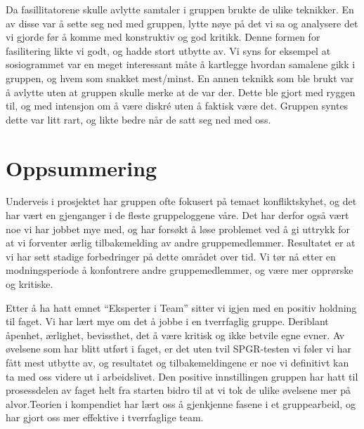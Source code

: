 \documentclass[a4paper,norsk,oneside]{article}
\begin{document}
Da fasillitatorene skulle avlytte samtaler i gruppen brukte de ulike teknikker. En av disse var å sette seg ned med gruppen, lytte nøye på det vi sa og analysere det vi gjorde før å komme med konstruktiv og god kritikk. Denne formen for fasilitering likte vi godt, og hadde stort utbytte av. Vi syns for eksempel at sosiogrammet var en meget interessant måte å kartlegge hvordan samalene gikk i gruppen, og hvem som snakket mest/minst.  En annen teknikk som ble brukt var å avlytte uten at gruppen skulle merke at de var der. Dette ble gjort med ryggen til, og med intensjon om å være diskré uten å faktisk være det. Gruppen syntes dette var litt rart, og likte bedre når de satt seg ned med oss.  

\section{Oppsummering}
Underveis i prosjektet har gruppen ofte fokusert på temaet konfliktskyhet, og det har vært en gjenganger i de fleste gruppeloggene våre. Det har derfor også vært noe vi har jobbet mye med, og har forsøkt å løse problemet ved å gi uttrykk for at vi forventer ærlig tilbakemelding av andre gruppemedlemmer. Resultatet er at vi har sett stadige forbedringer på dette området over tid. Vi tør nå etter en modningsperiode å konfontrere andre gruppemedlemmer, og være mer opprørske og kritiske.

Etter å ha hatt emnet “Eksperter i Team” sitter vi igjen med en positiv holdning til faget. Vi har lært mye om det å jobbe i en tverrfaglig gruppe. Deriblant åpenhet, ærlighet, bevissthet, det å være kritisk og ikke betvile egne evner. Av øvelsene som har blitt utført i faget, er det uten tvil SPGR-testen vi føler vi har fått mest utbytte av, og resultatet og tilbakemeldingene er noe vi definitivt kan ta med oss videre ut i arbeidslivet. Den positive innstillingen gruppen har hatt til prosessdelen av faget helt fra starten bidro til at vi tok de ulike øvelsene mer på alvor.Teorien i kompendiet har lært oss å gjenkjenne fasene i et gruppearbeid, og har gjort oss mer effektive i tverrfaglige team.

\clearpage



%
\end{document}
